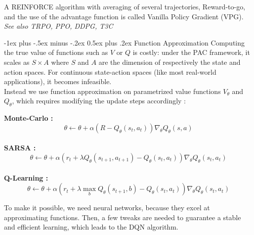 \documentclass[10pt,landscape]{article}
\makeatletter
\renewcommand{\section}{\@startsection{section}{1}{0mm}%
                                {-1ex plus -.5ex minus -.2ex}%
                                {0.5ex plus .2ex}%
                                {\normalfont\large\bfseries}}
\makeatother
\begin{document}
\begin{multicols}{3}
\medskip 
A REINFORCE algorithm with averaging of several trajectories, Reward-to-go, and the use of the advantage function is called Vanilla Policy Gradient (VPG).\\


\begingroup
    \fontsize{5pt}{6pt}
        \textit{See also TRPO, PPO, DDPG, T3C}
\endgroup



\section{Function Approximation}
Computing the true value of functions such as $V$ or $Q$ is costly: under the PAC framework, it scales as $S \times A$ where $S$ and $A$ are the dimension of respectively the state and action spaces. For continuous state-action spaces (like most real-world applications), it becomes infeasible.\\
Instead we use function approximation on parametrized value functions $V_\theta$ and $Q_\theta$, which requires modifying the update steps accordingly :

\medskip

\textbf{Monte-Carlo :}  $$\theta \leftarrow \theta + \alpha \left ( R - Q_\theta(s_t, a_t) \right ) \nabla_\theta Q_\theta(s,a)$$ \\
\textbf{SARSA :}  $$\theta \leftarrow \theta + \alpha \left ( r_t + \lambda Q_\theta(s_{t+1},a_{t+1}) - Q_\theta(s_t, a_t) \right ) \nabla_\theta Q_\theta(s_t,a_t)$$ \\
\textbf{Q-Learning :}  $$\theta \leftarrow \theta + \alpha \left ( r_t + \lambda \max\limits_b Q_\theta(s_{t+1},b) - Q_\theta(s_t, a_t) \right ) \nabla_\theta Q_\theta(s_t,a_t)$$

To make it possible, we need neural networks, because they excel at approximating functions. Then, a few tweaks are needed to guarantee a stable and efficient learning, which leads to the DQN algorithm.


\end{multicols}
\end{document}
